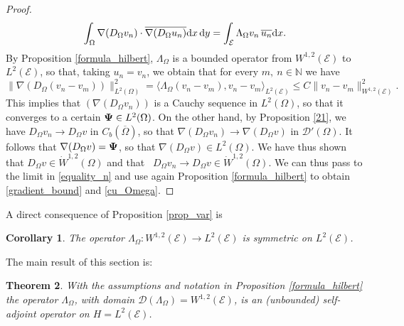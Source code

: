 \documentclass{amsart} %
\numberwithin{equation}{section}
\newtheorem{theorem}{Theorem}[section]
\newtheorem{corollary}[theorem]{Corollary}
\theoremstyle{definition}
\begin{document}
\begin{proof}
\begin{equation}\label{equality_n}
    \int_\Omega\nabla(D_\Omega v_n)\cdot \overline{\nabla (D_\Omega u_n)}{\rm d}x\,{\rm d}y=\int_{\mathcal{E}}\Lambda_\Omega v_n\,\overline{u_n}{\rm d}x.
\end{equation}
By Proposition \ref{formula_hilbert}, $\Lambda_\Omega$ is a bounded operator from $W^{1,2}(\mathcal{E})$ to $L^2(\mathcal{E})$, so that, taking $u_n = v_n$, we obtain that for every $m,\ n\in \mathbb{N}$ we have
\begin{equation}
    \|\nabla(D_\Omega(v_n - v_m))\|_{L^2(\Omega)}^2 = \langle \Lambda_\Omega(v_n - v_m), v_n - v_m \rangle_{L^2(\mathcal{E})} \leqslant C \|v_n - v_m\|_{W^{1,2}(\mathcal{E})}^2.
\end{equation}
This implies that $(\nabla(D_\Omega v_n))$ is a Cauchy sequence in $L^2(\Omega)$, so that it converges to a certain ${\bf \Psi}\in L^2(\Omega)$. On the other hand, by Proposition \ref{21}, we have $D_\Omega v_n\to D_\Omega v$ in $C_b(\overline\Omega)$, so that $\nabla(D_\Omega v_n)\to \nabla (D_\Omega v)$ in $\mathcal{D}'(\Omega)$.
It follows that $\nabla (D_\Omega v)={\bf \Psi}$, so that $\nabla (D_\Omega v) \in L^2(\Omega)$. We have thus shown that $D_\Omega v\in \dot{W}^{1,2}(\Omega)$ and that \ $D_\Omega v_n\to D_\Omega v\in \dot{W}^{1,2}(\Omega)$. We can thus pass to the limit in \eqref{equality_n} and use again Proposition \ref{formula_hilbert} to obtain \eqref{gradient_bound} and \eqref{cu_Omega}.
\end{proof}
A direct consequence of Proposition \ref{prop_var} is

\begin{corollary}\label{simetric}
The operator $\Lambda_\Omega:W^{1,2}(\mathcal{E}) \to L^2(\mathcal{E})$ is symmetric on $L^2(\mathcal{E})$.
\end{corollary}

The main result of this section is:

\begin{theorem}\label{formula_hadamard}
With the assumptions and notation in Proposition \ref{formula_hilbert} 
the operator $\Lambda_\Omega$, with domain $\mathcal{D}(\Lambda_\Omega)=W^{1,2}(\mathcal{E})$,
is an (unbounded) self-adjoint operator on $H=L^2(\mathcal{E})$.
\end{theorem}
\end{document}

